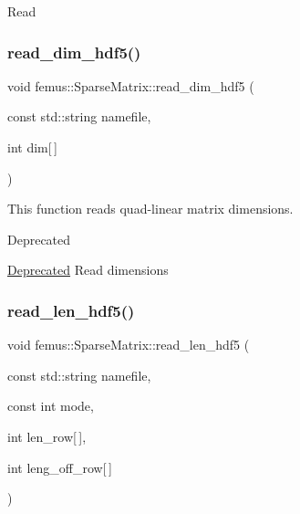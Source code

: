 Read \mbox{\label{classfemus_1_1_sparse_matrix_a68acca57de5d1d8a45ae9417c5a240d9}} 
\subsubsection{\texorpdfstring{read\+\_\+dim\+\_\+hdf5()}{read\_dim\_hdf5()}}
{\footnotesize\ttfamily void femus\+::\+Sparse\+Matrix\+::read\+\_\+dim\+\_\+hdf5 (\begin{DoxyParamCaption}\item[{const std\+::string}]{namefile,  }\item[{int}]{dim\mbox{[}$\,$\mbox{]} }\end{DoxyParamCaption})\hspace{0.3cm}{\ttfamily [virtual]}}



This function reads quad-\/linear matrix dimensions. 

\begin{DoxyRefDesc}{Deprecated}
\item[\mbox{\hyperlink{deprecated__deprecated000006}{Deprecated}}]Read dimensions \end{DoxyRefDesc}
\mbox{\label{classfemus_1_1_sparse_matrix_a0f747d58666367026b41df88d9cd8883}} 
\subsubsection{\texorpdfstring{read\+\_\+len\+\_\+hdf5()}{read\_len\_hdf5()}}
{\footnotesize\ttfamily void femus\+::\+Sparse\+Matrix\+::read\+\_\+len\+\_\+hdf5 (\begin{DoxyParamCaption}\item[{const std\+::string}]{namefile,  }\item[{const int}]{mode,  }\item[{int}]{len\+\_\+row\mbox{[}$\,$\mbox{]},  }\item[{int}]{leng\+\_\+off\+\_\+row\mbox{[}$\,$\mbox{]} }\end{DoxyParamCaption})\hspace{0.3cm}{\ttfamily [virtual]}}



